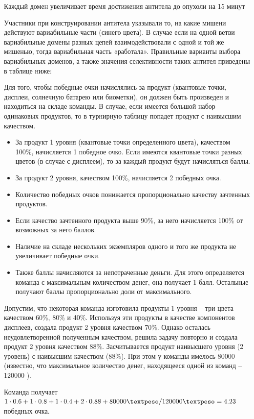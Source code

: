Каждый домен увеличивает время достижения антитела до опухоли на 15 минут

Участники при конструировании антитела указывали то, на какие мишени действуют вариабильные части (синего цвета). В случае если на одной ветви вариабильные домены разных цепей взаимодействовали с одной и той же мишенью, тогда вариабильная часть «работала». Правильные варианты выбора вариабильных доменов, а также значения селективности таких антител приведены в таблице ниже:

\markSection

Для того, чтобы победные очки начислялись за продукт (квантовые точки, дисплеи, солнечную батарею или биометки), он должен быть произведен и находиться на складе команды. В случае, если имеется большой набор одинаковых продуктов, то в турнирную таблицу попадет продукт с наивысшим качеством.

\begin{itemize}
	\item За продукт 1 уровня (квантовые точки определенного цвета), качеством 100\%, начисляется 1 победное очко. Если имеются квантовые точки разных цветов (в случае с дисплеем), то за каждый продукт будут начисляться баллы.
	\item За продукт 2 уровня, качеством 100\%, начисляется 2 победных очка.
	\item Количество победных очков понижается пропорционально качеству зачтенных продуктов.
	\item Если качество зачтенного продукта выше 90\%, за него начисляется 100\% от возможных за него баллов.
	\item Наличие на складе нескольких экземпляров одного и того же продукта не увеличивает победные очки.
	\item Также баллы начисляются за непотраченные деньги. Для этого определяется команда с максимальным количеством денег, она получает 1 балл. Остальные получают баллы пропорционально доли от максимального.
\end{itemize}

Допустим, что некоторая команда изготовила продукты 1 уровня – три цвета качеством 60\%, 80\% и 40\%. Используя эти продукты в качестве компонентов дисплеев, создала продукт 2 уровня качеством 70\%. Однако осталась неудовлетворенной полученным качеством, решила задачу повторно и создала продукт 2 уровня качеством 88\%. Засчитывается продукт наивысшего уровня (2 уровень) с наивысшим качеством (88\%). При этом у команды имелось 80000 \textpeso (известно, что максимальное количество денег, находящееся одной из команд – 120000 \textpeso).

Команда получает $1\cdot 0.6 + 1\cdot 0.8 + 1\cdot 0.4 + 2\cdot 0.88 + 80000 \textpeso /120000 \textpeso = 4.23$ победных очка.
